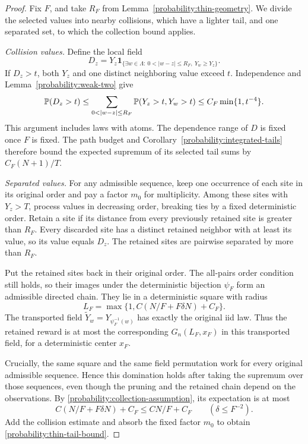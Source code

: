 \begin{proof}
Fix $F$, and take $R_F$ from
Lemma~\ref{probability:thin-geometry}.  We divide the selected
values into nearby collisions, which have a lighter tail, and one
separated set, to which the collection bound applies.

\par\smallskip\noindent\emph{Collision values.}\quad
Define the local field
\[
 D_z=Y_z\mathbf1_{\{\exists w\in\Lambda:\ 0<|w-z|\le R_F,
                                               \ Y_w\ge Y_z\}}.
\]
If $D_z>t$, both $Y_z$ and one distinct neighboring value exceed
$t$.  Independence and Lemma~\ref{probability:weak-two} give
\begin{equation}
 \PP(D_z>t)
 \le\sum_{0<|w-z|\le R_F}\PP(Y_z>t,Y_w>t)
 \le C_F\min\{1,t^{-4}\}.
 \label{probability:collision-four}
\end{equation}
This argument includes laws with atoms.  The dependence range of
$D$ is fixed once $F$ is fixed.  The path budget and
Corollary~\ref{probability:integrated-tails} therefore bound the
expected supremum of its selected tail sums by $C_F(N+1)/T$.

\par\smallskip\noindent\emph{Separated values.}\quad
For any admissible sequence, keep one occurrence of each site in
its original order and pay a factor $m_0$ for multiplicity.  Among
these sites with $Y_z>T$, process values in decreasing order,
breaking ties by a fixed deterministic order.  Retain a site if
its distance from every previously retained site is greater than
$R_F$.  Every discarded site has a distinct retained neighbor
with at least its value, so its value equals $D_z$.  The retained
sites are pairwise separated by more than $R_F$.

Put the retained sites back in their original order.  The all-pairs
order condition still holds, so their images under the deterministic
bijection $\psi_F$ form an admissible directed chain.  They lie
in a deterministic square with radius
\[
 L_F=\max\{1,C(N/F+F\delta N)+C_F\}.
\]
The transported field
$\widetilde Y_w=Y_{\psi_F^{-1}(w)}$ has exactly the original iid
law.  Thus the retained reward is at most the corresponding
$G_n(L_F,x_F)$ in this transported field, for a deterministic
center $x_F$.

Crucially, the same square and the same field permutation work for
every original admissible sequence.  Hence this domination holds
after taking the supremum over those sequences, even though the
pruning and the retained chain depend on the observations.  By
\eqref{probability:collection-assumption}, its expectation is at
most
\[
 C(N/F+F\delta N)+C_F\le CN/F+C_F
 \qquad(\delta\le F^{-2}).
\]
Add the collision estimate and absorb the fixed factor $m_0$ to
obtain \eqref{probability:thin-tail-bound}.


\end{proof}
